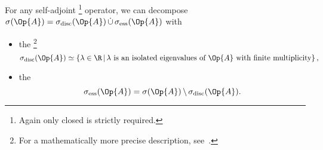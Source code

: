 \begin{defn}
	For any self-adjoint%
	\footnote{Again only closed is strictly required.}
	operator,
	we can decompose \linebreak
	$\sigma(\Op{A}) = \sigma_\text{disc}(\Op{A}) \, \dot{\cup} \, \sigma_\text{ess}(\Op{A})$
	with
	\begin{itemize}
		\item the %
			\footnote{For a mathematically more precise description, see~\cite[p.103 and p.132]{Helffer2013}.}
			\[ \sigma_\text{disc}(\Op{A}) \simeq \left\{ \lambda \in \R \, \middle|
			\, \text{$\lambda$ is an isolated eigenvalues of $\Op{A}$
			with finite multiplicity} \right\}, \]
		\item the 
			\[\sigma_\text{ess}(\Op{A}) 
			= \sigma(\Op{A}) \, \backslash \, \sigma_\text{disc}(\Op{A}). \]
	\end{itemize}
\end{defn}

